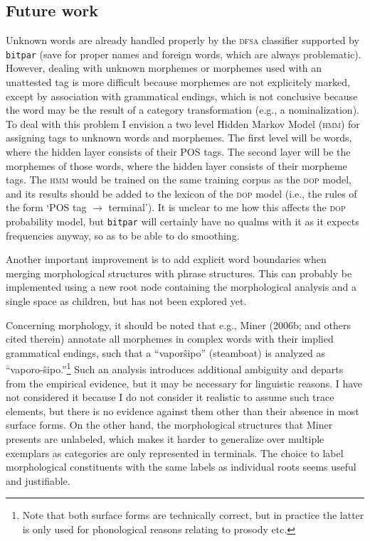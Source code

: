 \documentclass[10pt,a4paper]{article}
\begin{document}
\subsection{Future work}

Unknown words are already handled properly by the \textsc{dfsa} classifier supported by
\texttt{bitpar} (save for proper names and foreign words, which are always
problematic). However, dealing with unknown morphemes or morphemes used with an
unattested tag is more difficult because morphemes are not explicitely marked,
except by association with grammatical endings, which is not conclusive because
the word may be the result of a category transformation (e.g., a nominalization).
To deal with this problem I envision a two level Hidden Markov Model (\textsc{hmm}) for
assigning tags to unknown words and morphemes. The first level will be words,
where the hidden layer consists of their POS tags. The second layer will be the
morphemes of those words, where the hidden layer consists of their morpheme
tags. The \textsc{hmm} would be trained on the same training corpus as the \textsc{dop} model,
and its results should be added to the lexicon of the \textsc{dop} model (i.e., the rules
of the form `POS tag $\rightarrow$ terminal'). It is unclear to me how this
affects the \textsc{dop} probability model, but \texttt{bitpar} will certainly have no
qualms with it as it expects frequencies anyway, so as to be able to do
smoothing.

Another important improvement is to add explicit word boundaries when merging
morphological structures with phrase structures. This can probably be
implemented using a new root node containing the morphological analysis and a
single space as children, but has not been explored yet.

Concerning morphology, it should be noted that e.g., Miner (2006b; and others
cited therein) annotate all morphemes in complex words with their implied
grammatical endings, such that a ``vapor\^sipo'' (steamboat) is analyzed as
``vaporo-\^sipo.''\footnote{Note that both surface forms are technically
correct, but in practice the latter is only used for phonological reasons relating to
prosody etc.} Such an analysis introduces additional ambiguity and departs from
the empirical evidence, but it may be necessary for linguistic reasons.  I have
not considered it because I do not consider it realistic to assume such trace
elements, but there is no evidence against them other than their absence in
most surface forms. On the other hand, the morphological structures that Miner
presents are unlabeled, which makes it harder to generalize over multiple
exemplars as categories are only represented in terminals. The choice to label
morphological constituents with the same labels as individual roots seems
useful and justifiable.
\end{document}

